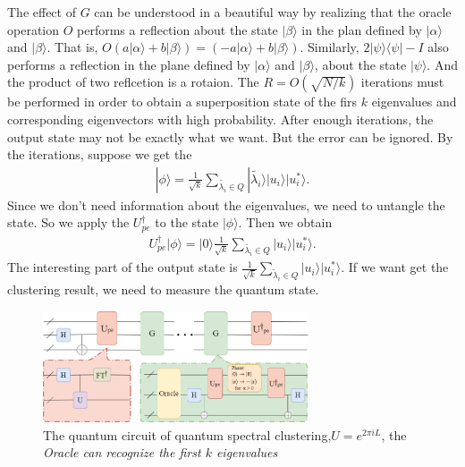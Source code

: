 \documentclass[twocolumn,notitlepage]{revtex4-1}
\def\ket#1{| #1 \rangle}
\def\bra#1{\langle #1 |}
\begin{document}
The effect of $G$ can be understood in a beautiful way by realizing that the oracle operation $O$ performs a reflection about the state $\ket{\beta}$ in the plan defined by $\ket{\alpha}$ and $\ket{\beta}$.
That is, $O(a\ket{\alpha}+b\ket{\beta})=(-a\ket{\alpha}+b\ket{\beta})$.
Similarly, $2\ket{\psi}\bra{\psi}-I$ also performs a reflection in the plane defined by $\ket{\alpha}$ and $\ket{\beta}$, about the state $\ket{\psi}$. And the product of two reflcetion is a rotaion. The $R=O(\sqrt{N/k})$ iterations must be performed in order to obtain a superposition state of the firs $k$ eigenvalues and corresponding eigenvectors with high probability. After enough iterations, the output state may not be exactly what we want. But the error can be ignored. By the iterations, suppose we get the
\begin{align}
    \ket{\phi}=\frac{1}{\sqrt{k}}\sum_{\tilde{\lambda_{i}}\in Q}\ket{\tilde{\lambda_{i}}}\ket{u_{i}}\ket{u_{i}^{*}}.
\end{align}
Since we don't need information about the eigenvalues, we need to untangle the state. So we apply the $U_{pe}^{\dagger}$ to the state $\ket{\phi}$. Then we obtain
\begin{align}
    U_{pe}^{\dagger}\ket{\phi}=\ket{0}\frac{1}{\sqrt{k}}\sum_{\tilde{\lambda_{i}}\in Q}\ket{u_{i}}\ket{u_{i}^{*}}.
\end{align}
The interesting part of the output state is $\frac{1}{\sqrt{k}}\sum_{\widetilde{\lambda}_i \in Q} \ket{u_i}\ket{u_i^*}$. If we want get the clustering result, we need to measure the quantum state.

\begin{figure}[H] %
    \centering %
    \includegraphics[width=0.7\textwidth]{image//circuit.png} %
    \caption{The quantum circuit of quantum spectral clustering,$U=e^{2\pi iL}$, the \em{Oracle} can recognize the first $k$ eigenvalues} %
    \label{Fig.main2} %
\end{figure}
\end{document}
